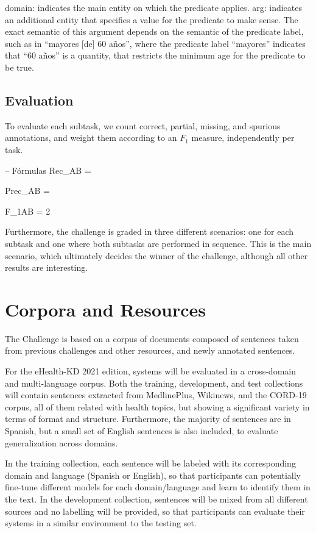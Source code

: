 \documentclass[a4paper,11pt,twocolumn,twoside]{article}
\begin{document}
domain: indicates the main entity on which the predicate applies.
arg: indicates an additional entity that specifies a value for the predicate to make sense. The exact semantic of this argument depends on the semantic of the predicate label, such as in “mayores [de] 60 años”, where the predicate label “mayores” indicates that “60 años” is a quantity, that restricts the minimum age for the predicate to be true.

\subsection{Evaluation}

To evaluate each subtask, we count correct, partial, missing, and spurious
annotations, and weight them according to an $F_1$ measure, independently per task.

-- Fórmulas
Rec_{AB} = 

Prec_{AB} = 

F_{1AB} = 2 \cdot {}

Furthermore, the challenge is graded in three different scenarios:
one for each subtask and one where both subtasks are performed in sequence.
This is the main scenario, which ultimately decides the winner of the challenge,
although all other results are interesting.

\section{Corpora and Resources}\label{sec:resources}

The Challenge is based on a corpus of documents composed of
sentences taken from previous challenges and other resources,
and newly annotated sentences.

For the eHealth-KD 2021 edition, systems will be evaluated in a cross-domain and multi-language corpus. 
Both the training, development, and test collections will contain sentences extracted from MedlinePlus, Wikinews, and the CORD-19 corpus, 
all of them related with health topics, but showing a significant variety in terms of format and structure. 
Furthermore, the majority of sentences are in Spanish, but a small set of English sentences is also included, to evaluate generalization across domains.

In the training collection, each sentence will be labeled with its corresponding domain and language (Spanish or English), 
so that participants can potentially fine-tune different models for each domain/language and learn to identify them in the text. 
In the development collection, sentences will be mixed from all different sources and no labelling will be provided, 
so that participants can evaluate their systems in a similar environment to the testing set.
\end{document}
